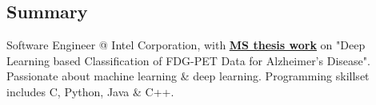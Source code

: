 \documentclass[hidelinks,letterpaper]{deedy-resume-openfont} %
\begin{document}

\lastupdated %


\sectionsep
\subsection{Summary}
Software Engineer @ Intel Corporation, with \href{https://repository.asu.edu/attachments/186430/content/Singh_asu_0010N_16846.pdf}{\bf\underline{MS thesis work}} on "Deep Learning based Classification of FDG-PET Data for Alzheimer's Disease". Passionate about machine learning \& deep learning. Programming skillset includes C, Python, Java \& C++.
\end{document}
